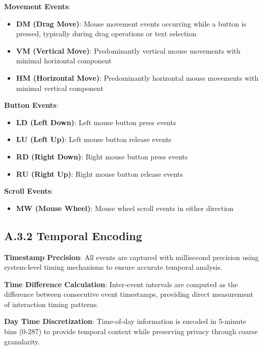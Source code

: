 \documentclass[
  12pt,
  a4paper,
]{report}
\providecommand{\tightlist}{%
  \setlength{\itemsep}{0pt}\setlength{\parskip}{0pt}}
\begin{document}
\textbf{Movement Events}:

\begin{itemize}
\tightlist
\item
  \textbf{DM (Drag Move)}: Mouse movement events occurring while a
  button is pressed, typically during drag operations or text selection
\item
  \textbf{VM (Vertical Move)}: Predominantly vertical mouse movements
  with minimal horizontal component
\item
  \textbf{HM (Horizontal Move)}: Predominantly horizontal mouse
  movements with minimal vertical component
\end{itemize}

\textbf{Button Events}:

\begin{itemize}
\tightlist
\item
  \textbf{LD (Left Down)}: Left mouse button press events
\item
  \textbf{LU (Left Up)}: Left mouse button release events
\item
  \textbf{RD (Right Down)}: Right mouse button press events
\item
  \textbf{RU (Right Up)}: Right mouse button release events
\end{itemize}

\textbf{Scroll Events}:

\begin{itemize}
\tightlist
\item
  \textbf{MW (Mouse Wheel)}: Mouse wheel scroll events in either
  direction
\end{itemize}

\subsection{A.3.2 Temporal Encoding}\label{a.3.2-temporal-encoding}

\textbf{Timestamp Precision}: All events are captured with millisecond
precision using system-level timing mechanisms to ensure accurate
temporal analysis.

\textbf{Time Difference Calculation}: Inter-event intervals are computed
as the difference between consecutive event timestamps, providing direct
measurement of interaction timing patterns.

\textbf{Day Time Discretization}: Time-of-day information is encoded in
5-minute bins (0-287) to provide temporal context while preserving
privacy through coarse granularity.
\end{document}
